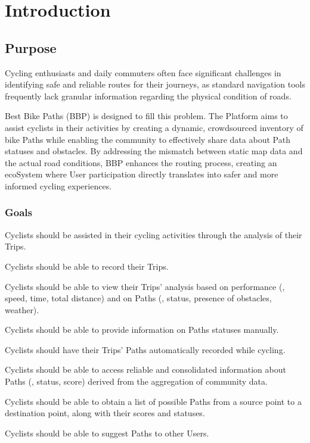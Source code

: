 \chapter{Introduction}

\section{Purpose}
Cycling enthusiasts and daily commuters often face significant challenges in identifying safe and reliable routes for their journeys, as standard navigation tools frequently lack granular information regarding the physical condition of roads.

Best Bike Paths (BBP) is designed to fill this problem. The Platform aims to assist cyclists in their activities by creating a dynamic, crowdsourced inventory of bike Paths while enabling the community to effectively share data about Path statuses and obstacles. By addressing the mismatch between static map data and the actual road conditions, BBP enhances the routing process, creating an ecoSystem where User participation directly translates into safer and more informed cycling experiences.

\subsection{Goals}
\begin{glist}
    \item Cyclists should be assisted in their cycling activities through the analysis of their Trips.
    \item Cyclists should be able to record their Trips.
    \item Cyclists should be able to view their Trips' analysis based on performance (\eg, speed, time, total distance) and on Paths (\eg, status, presence of obstacles, weather).
    \item Cyclists should be able to provide information on Paths statuses manually.
    \item Cyclists should have their Trips' Paths automatically recorded while cycling.
    \item Cyclists should be able to access reliable and consolidated information about Paths (\eg, status, score) derived from the aggregation of community data.
    \item Cyclists should be able to obtain a list of possible Paths from a source point to a destination point, along with their scores and statuses.
    \item Cyclists should be able to suggest Paths to other Users.
\end{glist}

